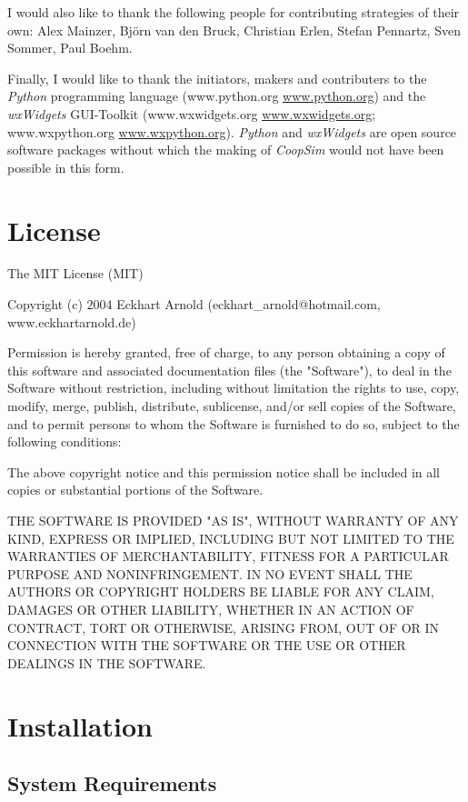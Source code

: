 \documentclass[12pt,a4paper,USenglish]{article}
\begin{document}
I would also like to thank the following people for contributing
strategies of their own: Alex Mainzer, Björn van den Bruck, 
Christian Erlen, Stefan Pennartz, Sven Sommer, Paul Boehm.

Finally, I would like to thank the initiators, makers and contributers
to the \emph{Python} programming language (www.python.org
\url{www.python.org}) and the \emph{wxWidgets} GUI-Toolkit
(www.wxwidgets.org \url{www.wxwidgets.org}; www.wxpython.org
\url{www.wxpython.org}). \emph{Python} and \emph{wxWidgets} are open
source software packages without which the making of \emph{CoopSim}
would not have been possible in this form.

\section{License}

The MIT License (MIT)

Copyright (c) 2004 Eckhart Arnold (eckhart\_arnold@hotmail.com, www.eckhartarnold.de)

Permission is hereby granted, free of charge, to any person obtaining a copy
of this software and associated documentation files (the "Software"), to deal
in the Software without restriction, including without limitation the rights
to use, copy, modify, merge, publish, distribute, sublicense, and/or sell
copies of the Software, and to permit persons to whom the Software is
furnished to do so, subject to the following conditions:

The above copyright notice and this permission notice shall be included in
all copies or substantial portions of the Software.

THE SOFTWARE IS PROVIDED "AS IS", WITHOUT WARRANTY OF ANY KIND, EXPRESS OR
IMPLIED, INCLUDING BUT NOT LIMITED TO THE WARRANTIES OF MERCHANTABILITY,
FITNESS FOR A PARTICULAR PURPOSE AND NONINFRINGEMENT. IN NO EVENT SHALL THE
AUTHORS OR COPYRIGHT HOLDERS BE LIABLE FOR ANY CLAIM, DAMAGES OR OTHER
LIABILITY, WHETHER IN AN ACTION OF CONTRACT, TORT OR OTHERWISE, ARISING FROM,
OUT OF OR IN CONNECTION WITH THE SOFTWARE OR THE USE OR OTHER DEALINGS IN
THE SOFTWARE.

\section{Installation}

\subsection{System Requirements}
\end{document}
